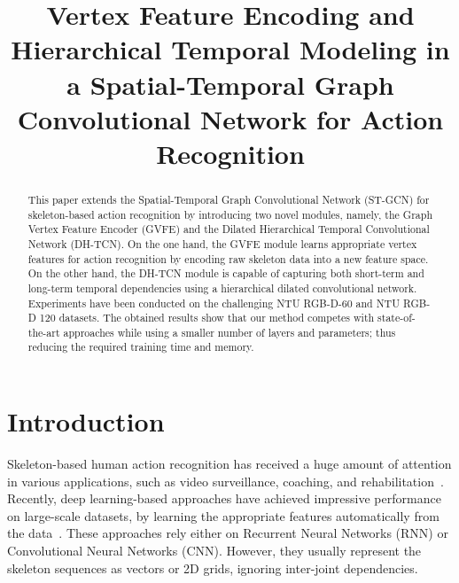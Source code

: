 \documentclass{article}
\begin{document}
\sloppy

\def\x{{\mathbf x}}
\def\L{{\cal L}}


\title{Vertex Feature Encoding and Hierarchical Temporal Modeling in a Spatial-Temporal Graph Convolutional Network for Action Recognition}
\address{Interdisciplinary Centre for Security, Reliability and Trust (SnT)\\University of Luxembourg, Luxembourg\\  \small{\{\tt konstantinos.papadopoulos, enjie.ghorbel, djamila.aouada, bjorn.ottersten\}@uni.lu}}




\maketitle


\begin{abstract}
This paper extends the Spatial-Temporal Graph Convolutional Network (ST-GCN) for skeleton-based action recognition by introducing two novel modules, namely, the Graph Vertex Feature Encoder (GVFE) and the Dilated Hierarchical Temporal Convolutional Network (DH-TCN). On the one hand, the GVFE module learns appropriate vertex features for action recognition by encoding raw skeleton data into a new feature space. On the other hand, the DH-TCN module is capable of capturing both short-term and long-term temporal dependencies using a hierarchical dilated convolutional network. Experiments have been conducted on the challenging NTU RGB-D-60 and NTU RGB-D 120 datasets. The obtained results show that our method competes with state-of-the-art approaches while using a smaller number of layers and parameters; thus reducing the required training time and memory.
\end{abstract}

\section{Introduction}
\label{sec:introduction}
Skeleton-based human action recognition has received a huge amount of attention in various applications, such as video surveillance, coaching, and rehabilitation~\cite{6239233, ghorbel2018extension, 6909493, ghorbel2019view, papadopoulos2019two}. Recently, deep learning-based approaches have achieved impressive performance on large-scale datasets, by learning the appropriate features automatically from the data~\cite{10.1007/978-3-319-46478-7_23, caetano2019skelemotion, ke2018learning, liu2017enhanced, demisse2018pose, baptista2019view}. These approaches rely either on Recurrent Neural Networks (RNN) or Convolutional Neural Networks (CNN). However, they usually represent the skeleton sequences as vectors or 2D grids, ignoring inter-joint dependencies. 
\end{document}
